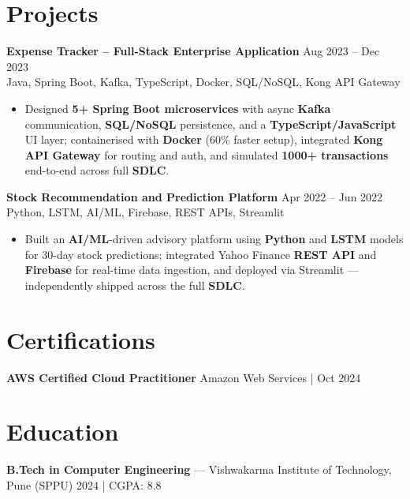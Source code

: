 \documentclass[10pt,letterpaper]{article}
\newcommand{\resumeSubheading}[4]{%
  \textbf{#1} \hfill #2 \\
  #3 \hfill #4 \\
}
\begin{document}
\section*{Projects}

\resumeSubheading{Expense Tracker -- Full-Stack Enterprise Application}{Aug 2023 -- Dec 2023}{}{Java, Spring Boot, Kafka, TypeScript, Docker, SQL/NoSQL, Kong API Gateway}
\begin{itemize}
    \item Designed \textbf{5+ Spring Boot microservices} with async \textbf{Kafka} communication, \textbf{SQL/NoSQL} persistence, and a \textbf{TypeScript/JavaScript} UI layer; containerised with \textbf{Docker} (60\% faster setup), integrated \textbf{Kong API Gateway} for routing and auth, and simulated \textbf{1000+ transactions} end-to-end across full \textbf{SDLC}.
\end{itemize}

\resumeSubheading{Stock Recommendation and Prediction Platform}{Apr 2022 -- Jun 2022}{}{Python, LSTM, AI/ML, Firebase, REST APIs, Streamlit}
\begin{itemize}
    \item Built an \textbf{AI/ML}-driven advisory platform using \textbf{Python} and \textbf{LSTM} models for 30-day stock predictions; integrated Yahoo Finance \textbf{REST API} and \textbf{Firebase} for real-time data ingestion, and deployed via Streamlit --- independently shipped across the full \textbf{SDLC}.
\end{itemize}

\section*{Certifications}
\textbf{AWS Certified Cloud Practitioner} \hfill Amazon Web Services \;|\; Oct 2024

\section*{Education}
\textbf{B.Tech in Computer Engineering} --- Vishwakarma Institute of Technology, Pune (SPPU) \hfill 2024 \;|\; CGPA: 8.8
\end{document}
